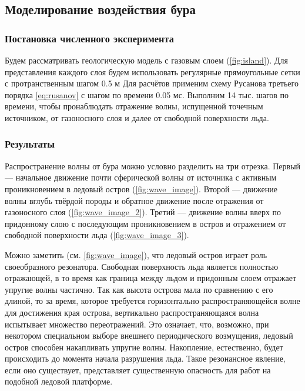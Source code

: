 \subsection{Моделирование воздействия бура}

\subsubsection{Постановка численного эксперимента}

Будем рассматривать геологическую модель с газовым слоем (\autoref{fig:island}). Для представления каждого слоя будем использовать регулярные прямоугольные сетки с протранственным шагом 0.5 м Для расчётов применим схему Русанова третьего порядка \eqref{eq:rusanov} с шагом по времени 0.05 мс. Выполним 14 тыс. шагов по времени, чтобы пронаблюдать отражение волны, испущенной точечным источником, от газоносного слоя и далее от свободной поверхности льда.

\subsubsection{Результаты}

Распространение волны от бура можно условно разделить на три  отрезка. Первый --- начальное движение почти  сферической волны от источника с активным проникновением в ледовый остров (\autoref{fig:wave_image}). Второй --- движение волны вглубь твёрдой породы и обратное движение после отражения от газоносного слоя (\autoref{fig:wave_image_2}). Третий --- движение волны вверх по придонному слою с последующим проникновением в остров и отражением от свободной поверхности льда (\autoref{fig:wave_image_3}).

Можно заметить (см. \autoref{fig:wave_image}), что ледовый остров играет роль своеобразного резонатора. Свободная поверхность льда является полностью отражающей, в то время как граница между льдом и придонным слоем отражает упругие волны частично. Так как высота острова мала по сравнению с его длиной, то за время, которое требуется  горизонтально распространяющейся волне для достижения края острова, вертикально распространяющаяся волна испытывает множество переотражений. Это означает, что, возможно, при некотором специальном выборе внешнего периодического возмущения, ледовый остров способен накапливать упругие волны. Накопление, естественно, будет происходить до момента начала разрушения льда. Такое резонансное явление, если оно существует, представляет существенную опасность для работ на подобной ледовой платформе.

